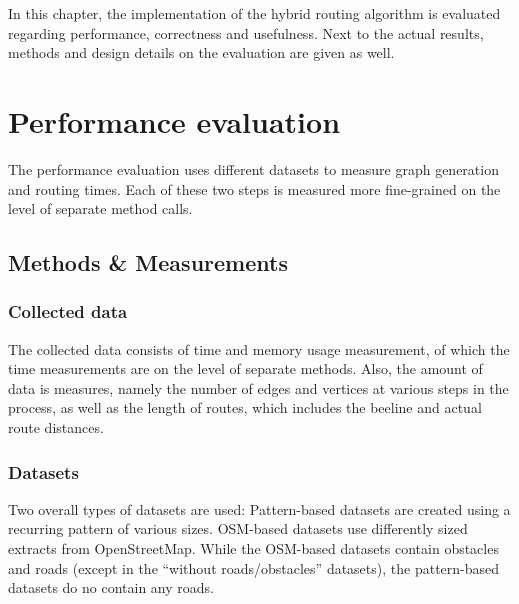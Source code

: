 
In this chapter, the implementation of the hybrid routing algorithm is evaluated regarding performance, correctness and usefulness.
Next to the actual results, methods and design details on the evaluation are given as well.

\section{Performance evaluation}

	The performance evaluation uses different datasets to measure graph generation and routing times.
	Each of these two steps is measured more fine-grained on the level of separate method calls.

	\subsection{Methods \& Measurements}

		\subsubsection{Collected data}
		
			The collected data consists of time and memory usage measurement, of which the time measurements are on the level of separate methods.
			Also, the amount of data is measures, namely the number of edges and vertices at various steps in the process, as well as the length of routes, which includes the beeline and actual route distances.
		
		\subsubsection{Datasets}
		\label{subsubsec:eval-datasets}
		
			Two overall types of datasets are used:
			Pattern-based datasets are created using a recurring pattern of various sizes.
			OSM-based datasets use differently sized extracts from OpenStreetMap.
			While the OSM-based datasets contain obstacles and roads (except in the \enquote{without roads/obstacles} datasets), the pattern-based datasets do no contain any roads.
			
